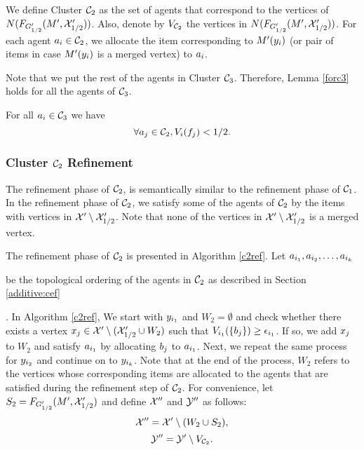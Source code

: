  




We define Cluster $\mathcal{C}_2$ as the set of agents that correspond to the vertices of $N(F_{G'_{1/2}}(M',\mathcal{X}'_{1/2}))$. Also, denote by $V_{\mathcal{C}_2}$ the vertices in $N(F_{G'_{1/2}}(M',\mathcal{X}'_{1/2}))$. For each agent $a_i \in \mathcal{C}_2$, we allocate the item corresponding to $M'(y_i)$ (or pair of items in case  $M'(y_i)$ is a merged vertex) to $a_i$.


Note that we put the rest of the agents in Cluster $\mathcal{C}_3$. Therefore, Lemma \ref{forc3} holds for all the agents of $\mathcal{C}_3$.

\begin{lemma}
\label{forc3}
For all $a_i \in \mathcal{C}_3$ we have \[ \forall a_j \in \mathcal{C}_2, V_i(f_j) < 1/2. \]
\end{lemma}

\subsubsection{Cluster $\mathcal{C}_2$ Refinement}
The refinement phase of $\mathcal{C}_2$, is semantically similar to the refinement phase of $\mathcal{C}_1$. In the refinement phase of $\mathcal{C}_2$, we satisfy some of the agents of $\mathcal{C}_2$ by the items with vertices in $\mathcal{X}' \setminus \mathcal{X}'_{1/2}$. Note that none of the vertices in $\mathcal{X}' \setminus \mathcal{X}'_{1/2}$ is a merged vertex.


The refinement phase of $\mathcal{C}_2$ is presented in Algorithm \ref{c2ref}. Let $a_{i_1}, a_{i_2}, \ldots, a_{i_k}$ 
\begin{comment}
$\agentv_{i_1}, \agentv_{i_2}, \ldots, \agentv_{i_k}$ 
\end{comment}
be the topological ordering of the agents in $\mathcal{C}_2$ as described in Section \ref{additive:cef}
\begin{comment}
with respect to their representation graph
\end{comment}
. In Algorithm \ref{c2ref}, We start with $y_{i_1}$ and $W_2 = \emptyset$ and check whether there exists a vertex $x_j \in \mathcal{X}' \setminus (\mathcal{X}'_{1/2} \cup W_2)$ such that $V_{i_1}(\{b_j\}) \geq \epsilon_{i_1}$. If so, we add $x_j$ to $W_2$ and satisfy $a_{i_1}$ by allocating $b_j$ to $a_{i_1}$. Next, we repeat the same process for $y_{i_2}$ and continue on to $y_{i_k}$. Note that at the end of the process, $W_2$ refers to the vertices whose corresponding items are allocated to the agents that are satisfied during the refinement step of $\mathcal{C}_2$. For convenience, let $S_2 = F_{G'_{1/2}}(M',\mathcal{X}'_{1/2})$ and define $\mathcal{X}''$ and $\mathcal{Y}''$ as follows:
$$\mathcal{X}'' = \mathcal{X}' \setminus (W_2 \cup S_2),$$
$$\mathcal{Y}'' = \mathcal{Y}' \setminus V_{\mathcal{C}_2}.$$

